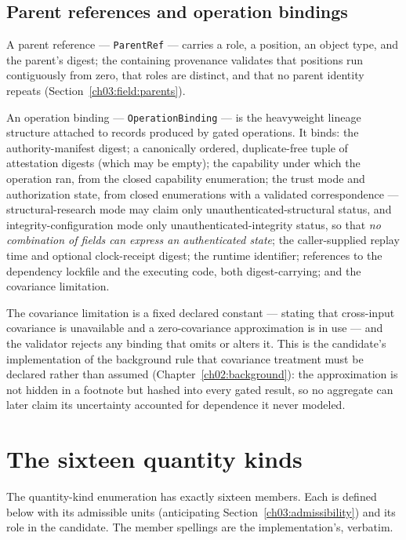 \subsection{Parent references and operation bindings}\label{ch03:id:parents}

A parent reference --- \texttt{ParentRef} --- carries a role, a position, an object type, and the parent's digest; the containing provenance validates that positions run contiguously from zero, that roles are distinct, and that no parent identity repeats (Section~\ref{ch03:field:parents}).

An operation binding --- \texttt{OperationBinding} --- is the heavyweight lineage structure attached to records produced by gated operations. It binds: the authority-manifest digest; a canonically ordered, duplicate-free tuple of attestation digests (which may be empty); the capability under which the operation ran, from the closed capability enumeration; the trust mode and authorization state, from closed enumerations with a validated correspondence --- structural-research mode may claim only unauthenticated-structural status, and integrity-configuration mode only unauthenticated-integrity status, so that \emph{no combination of fields can express an authenticated state}; the caller-supplied replay time and optional clock-receipt digest; the runtime identifier; references to the dependency lockfile and the executing code, both digest-carrying; and the covariance limitation.

The covariance limitation is a fixed declared constant --- stating that cross-input covariance is unavailable and a zero-covariance approximation is in use --- and the validator rejects any binding that omits or alters it. This is the candidate's implementation of the background rule that covariance treatment must be declared rather than assumed (Chapter~\ref{ch02:background}): the approximation is not hidden in a footnote but hashed into every gated result, so no aggregate can later claim its uncertainty accounted for dependence it never modeled.

\section{The sixteen quantity kinds}\label{ch03:quantities}

The quantity-kind enumeration has exactly sixteen members. Each is defined below with its admissible units (anticipating Section~\ref{ch03:admissibility}) and its role in the candidate. The member spellings are the implementation's, verbatim.

